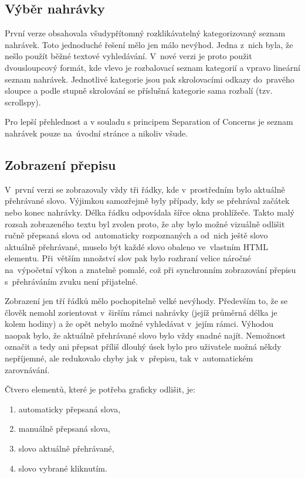 \subsection{Výběr nahrávky}

První verze obsahovala všudypřítomný rozklikávatelný kategorizovaný seznam
nahrávek. Toto jednoduché řešení mělo jen málo nevýhod. Jedna z~nich byla, že
nešlo použít běžné textové vyhledávání. V~nové verzi je proto použit
dvousloupcový formát, kde vlevo je rozbalovací seznam kategorií a vpravo
lineární seznam nahrávek. Jednotlivé kategorie jsou pak skrolovacími odkazy
do~pravého sloupce a podle stupně skrolování se příslušná kategorie sama
rozbalí (tzv. scrollspy).

Pro lepší přehlednost a v souladu s principem Separation of Concerns je seznam
nahrávek pouze na~úvodní stránce a nikoliv všude.

\subsection{Zobrazení přepisu}

V~první verzi se zobrazovaly vždy tři řádky, kde v~prostředním bylo aktuálně
přehrávané slovo. Výjimkou samozřejmě byly případy, kdy se přehrával začátek
nebo konec nahrávky. Délka řádku odpovídala šířce okna prohlížeče. Takto malý
rozsah zobrazeného textu byl zvolen proto, že aby bylo možné vizuálně odlišit
ručně přepsaná slova od~automaticky rozpoznaných a od~nich ještě slovo aktuálně
přehrávané, muselo být každé slovo obaleno ve~vlastním HTML elementu. Při~větším
množství slov pak bylo rozhraní velice náročné na~výpočetní výkon a znatelně
pomalé, což při synchronním zobrazování přepisu s~přehráváním zvuku není
přijatelné.

Zobrazení jen tří řádků mělo pochopitelně velké nevýhody. Především to, že se
člověk nemohl zorientovat v~širším rámci nahrávky (jejíž průměrná délka je kolem
hodiny) a že opět nebylo možné vyhledávat v~jejím rámci. Výhodou naopak bylo, že
aktuálně přehrávané slovo bylo vždy snadné najít. Nemožnost označit a tedy ani
přepsat příliš dlouhý úsek bylo pro uživatele možná někdy nepříjemné, ale
redukovalo chyby jak v~přepisu, tak v~automatickém zarovnávání.

Čtvero elementů, které je potřeba graficky odlišit, je: 
\begin{enumerate}
\item{automaticky přepsaná slova},
\item{manuálně přepsaná slova,}
\item{slovo aktuálně přehrávané,}
\item{slovo vybrané kliknutím.}
\end{enumerate}

